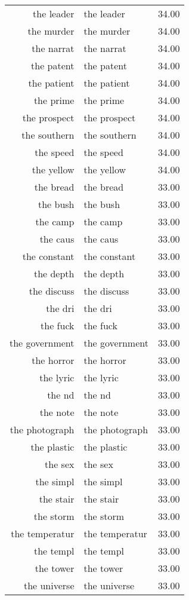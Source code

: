 \begin{table}[ht]
\begin{tabular}{rlr}
  the leader & the leader & 34.00 \\ 
  the murder & the murder & 34.00 \\ 
  the narrat & the narrat & 34.00 \\ 
  the patent & the patent & 34.00 \\ 
  the patient & the patient & 34.00 \\ 
  the prime & the prime & 34.00 \\ 
  the prospect & the prospect & 34.00 \\ 
  the southern & the southern & 34.00 \\ 
  the speed & the speed & 34.00 \\ 
  the yellow & the yellow & 34.00 \\ 
  the bread & the bread & 33.00 \\ 
  the bush & the bush & 33.00 \\ 
  the camp & the camp & 33.00 \\ 
  the caus & the caus & 33.00 \\ 
  the constant & the constant & 33.00 \\ 
  the depth & the depth & 33.00 \\ 
  the discuss & the discuss & 33.00 \\ 
  the dri & the dri & 33.00 \\ 
  the fuck & the fuck & 33.00 \\ 
  the government & the government & 33.00 \\ 
  the horror & the horror & 33.00 \\ 
  the lyric & the lyric & 33.00 \\ 
  the nd & the nd & 33.00 \\ 
  the note & the note & 33.00 \\ 
  the photograph & the photograph & 33.00 \\ 
  the plastic & the plastic & 33.00 \\ 
  the sex & the sex & 33.00 \\ 
  the simpl & the simpl & 33.00 \\ 
  the stair & the stair & 33.00 \\ 
  the storm & the storm & 33.00 \\ 
  the temperatur & the temperatur & 33.00 \\ 
  the templ & the templ & 33.00 \\ 
  the tower & the tower & 33.00 \\ 
  the universe & the universe & 33.00 \\ 

\end{tabular}
\end{table}
